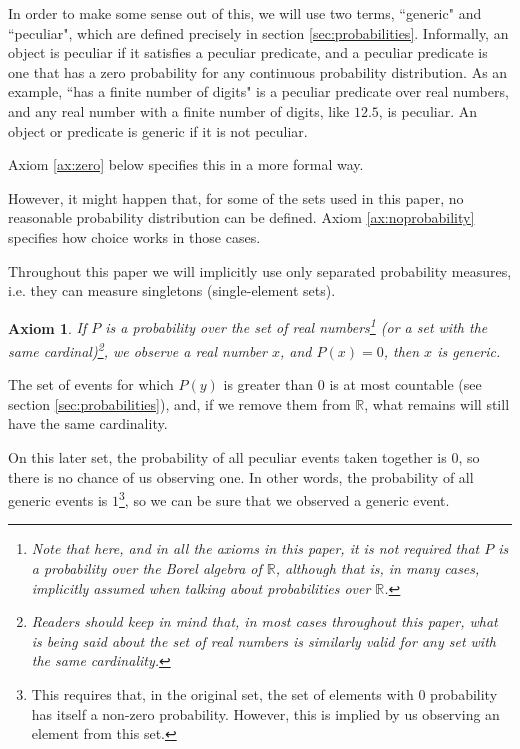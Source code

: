 \documentclass[a4paper
]{article}
\def\reale{\mathbb{R}}
\newcommand{\paper}[1]{paper}
\newcommand{\ghilimele}[1]{``#1"}
\newtheorem{axiom}{Axiom}
\begin{document}
In order to make some sense out of this, we will use two terms,
\ghilimele{generic} and \ghilimele{peculiar},
which are defined precisely in section \ref{sec:probabilities}.
Informally,
an object is peculiar if it satisfies a peculiar predicate, and a peculiar
predicate is one that has a zero probability for any continuous probability
distribution.
As an example,
\ghilimele{has a finite number of digits} is a peculiar
predicate over real numbers, and any real number with a finite number
of digits, like $12.5$, is peculiar. An object or predicate is generic if
it is not peculiar.

Axiom \ref{ax:zero} below specifies this in a more formal way.

However, it might happen that, for some of the sets used in this \paper{},
no reasonable probability distribution can be defined.
Axiom \ref{ax:noprobability} specifies how choice works in those cases.

Throughout this paper we will implicitly use only separated probability
measures, i.e. they can measure singletons (single-element sets).

\begin{axiom}
  \label{ax:zeroisgeneric}
  If $P$ is a probability over the set of real numbers\footnote{Note
    that here, and in all the axioms in this paper, it is not required that
    $P$ is a probability over the
    Borel algebra of $\reale$, although that is, in many cases, implicitly
    assumed when talking about probabilities over $\reale$.
  }
  (or a set with the same cardinal)\footnote{
    Readers should
    keep in mind that, in most cases throughout this paper, what is being said
    about the set of real numbers is similarly valid for any set with the same
    cardinality.},
  we observe a real number $x$, and $P(x)=0$, then $x$ is generic.
\end{axiom}

The set of events for which $P(y)$ is
greater than $0$ is at most countable (see section \ref{sec:probabilities}),
and, if we remove them from $\reale$, what remains will still have
the same cardinality.

On this later set, the probability
of all peculiar events taken together is $0$, so there is no chance of us
observing one.
In other words, the probability of all generic events is $1$\footnote{This
  requires that, in the original set, the set of elements with $0$ probability
  has itself a non-zero probability. However, this is implied by us observing
  an element from this set.
},
so we can be sure that we observed a generic event.
\end{document}
